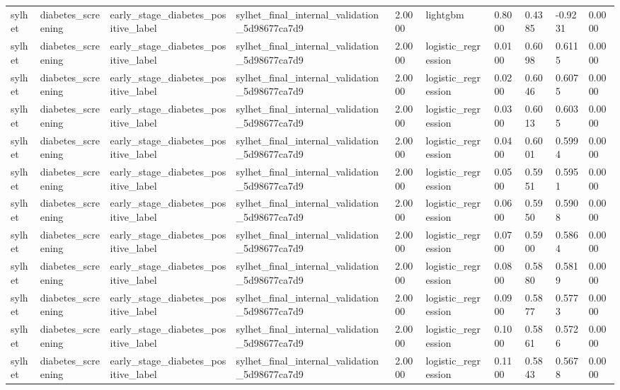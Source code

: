 \begin{tabular}{llllllllll}
sylhet & diabetes\_screening & early\_stage\_diabetes\_positive\_label & sylhet\_final\_internal\_validation\_5d98677ca7d9 & 2.0000 & lightgbm & 0.8000 & 0.4385 & -0.9231 & 0.0000 \\
sylhet & diabetes\_screening & early\_stage\_diabetes\_positive\_label & sylhet\_final\_internal\_validation\_5d98677ca7d9 & 2.0000 & logistic\_regression & 0.0100 & 0.6098 & 0.6115 & 0.0000 \\
sylhet & diabetes\_screening & early\_stage\_diabetes\_positive\_label & sylhet\_final\_internal\_validation\_5d98677ca7d9 & 2.0000 & logistic\_regression & 0.0200 & 0.6046 & 0.6075 & 0.0000 \\
sylhet & diabetes\_screening & early\_stage\_diabetes\_positive\_label & sylhet\_final\_internal\_validation\_5d98677ca7d9 & 2.0000 & logistic\_regression & 0.0300 & 0.6013 & 0.6035 & 0.0000 \\
sylhet & diabetes\_screening & early\_stage\_diabetes\_positive\_label & sylhet\_final\_internal\_validation\_5d98677ca7d9 & 2.0000 & logistic\_regression & 0.0400 & 0.6001 & 0.5994 & 0.0000 \\
sylhet & diabetes\_screening & early\_stage\_diabetes\_positive\_label & sylhet\_final\_internal\_validation\_5d98677ca7d9 & 2.0000 & logistic\_regression & 0.0500 & 0.5951 & 0.5951 & 0.0000 \\
sylhet & diabetes\_screening & early\_stage\_diabetes\_positive\_label & sylhet\_final\_internal\_validation\_5d98677ca7d9 & 2.0000 & logistic\_regression & 0.0600 & 0.5950 & 0.5908 & 0.0000 \\
sylhet & diabetes\_screening & early\_stage\_diabetes\_positive\_label & sylhet\_final\_internal\_validation\_5d98677ca7d9 & 2.0000 & logistic\_regression & 0.0700 & 0.5900 & 0.5864 & 0.0000 \\
sylhet & diabetes\_screening & early\_stage\_diabetes\_positive\_label & sylhet\_final\_internal\_validation\_5d98677ca7d9 & 2.0000 & logistic\_regression & 0.0800 & 0.5880 & 0.5819 & 0.0000 \\
sylhet & diabetes\_screening & early\_stage\_diabetes\_positive\_label & sylhet\_final\_internal\_validation\_5d98677ca7d9 & 2.0000 & logistic\_regression & 0.0900 & 0.5877 & 0.5773 & 0.0000 \\
sylhet & diabetes\_screening & early\_stage\_diabetes\_positive\_label & sylhet\_final\_internal\_validation\_5d98677ca7d9 & 2.0000 & logistic\_regression & 0.1000 & 0.5861 & 0.5726 & 0.0000 \\
sylhet & diabetes\_screening & early\_stage\_diabetes\_positive\_label & sylhet\_final\_internal\_validation\_5d98677ca7d9 & 2.0000 & logistic\_regression & 0.1100 & 0.5843 & 0.5678 & 0.0000 \\

\end{tabular}
